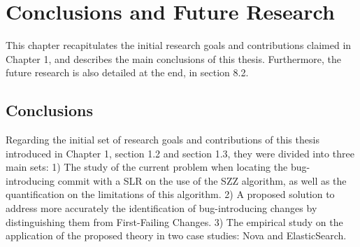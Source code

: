 \documentclass[a4paper, 12pt]{book}
\begin{document}

    
    

\cleardoublepage
\chapter{Conclusions and Future Research}
\label{chap:conclusions}

This chapter recapitulates the initial research goals and contributions claimed in Chapter 1, and describes the main conclusions of this thesis. Furthermore, the future research is also detailed at the end, in section 8.2.

\section{Conclusions}

Regarding the initial set of research goals and contributions of this thesis introduced in Chapter 1, section 1.2 and section 1.3, they were divided into three main sets: 1) The study of the current problem when locating the bug-introducing commit with a SLR on the use of the SZZ algorithm, as well as the quantification on the limitations of this algorithm. 2) A proposed solution to address more accurately the identification of bug-introducing changes by distinguishing them from First-Failing Changes. 3) The empirical study on the application of the proposed theory in two case studies: Nova and ElasticSearch.  
\end{document}
